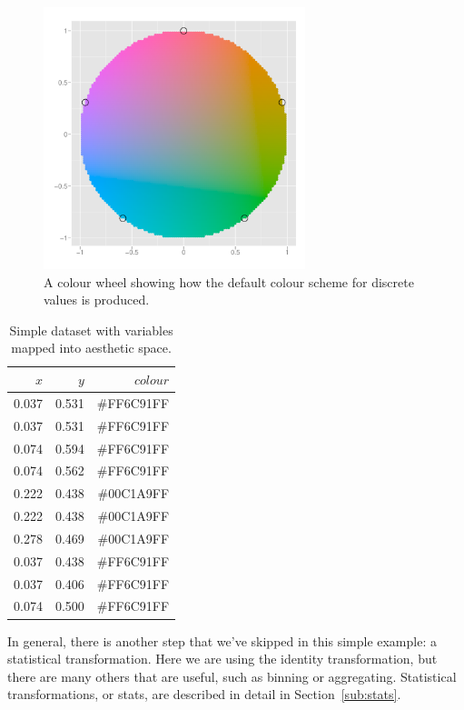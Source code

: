 \begin{figure}[htbp]
  \centering
    \includegraphics[width=3in]{colour-wheel.pdf}
  \caption{A colour wheel showing how the default colour scheme for discrete values is produced.}
  \label{fig:colour-wheel}
\end{figure}

\begin{table}[ht]
  \begin{center}
  \begin{tabular}{rrr}
    \toprule
    $x$ & $y$ & $colour$\\
    \midrule
    0.037 & 0.531 & \#FF6C91FF\\
    0.037 & 0.531 & \#FF6C91FF\\
    0.074 & 0.594 & \#FF6C91FF\\
    0.074 & 0.562 & \#FF6C91FF\\
    0.222 & 0.438 & \#00C1A9FF\\
    0.222 & 0.438 & \#00C1A9FF\\
    0.278 & 0.469 & \#00C1A9FF\\
    0.037 & 0.438 & \#FF6C91FF\\
    0.037 & 0.406 & \#FF6C91FF\\
    0.074 & 0.500 & \#FF6C91FF\\
    \bottomrule
  \end{tabular}
  \end{center}
  \caption{Simple dataset with variables mapped into aesthetic space.}
  \label{tbl:scaled}
\end{table}

In general, there is another step that we've skipped in this simple example: a statistical transformation.  Here we are using the identity transformation, but there are many others that are useful, such as binning or aggregating.  Statistical transformations, or stats, are described in detail in Section~\ref{sub:stats}.


